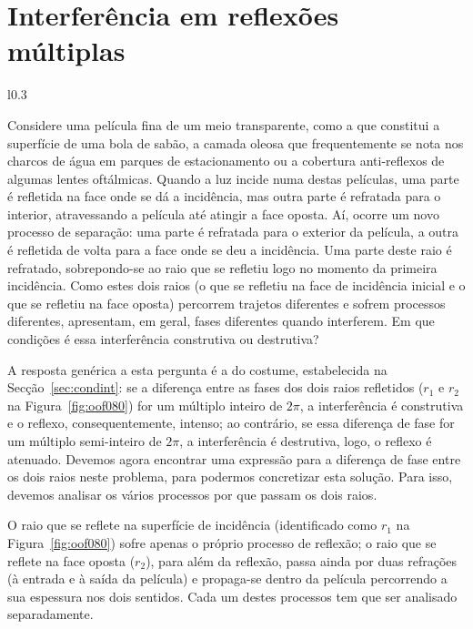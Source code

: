 \section{Interferência em reflexões múltiplas}
\begin{wrapfigure}[10]{l}{0.3\textwidth}
    {\centering
        \caption{Interferência em reflexões múltiplas\label{fig:oof080}}

    }
\end{wrapfigure}
Considere uma película fina de um meio transparente, como a que constitui a
superfície de uma bola de sabão, a camada oleosa que frequentemente se nota nos
charcos de água em parques de estacionamento ou a cobertura anti-reflexos de
algumas lentes oftálmicas. Quando a luz incide numa destas películas, uma parte
é refletida na face onde se dá a incidência, mas outra parte é refratada para o
interior, atravessando a película até atingir a face oposta. Aí, ocorre um novo
processo de separação: uma parte é refratada para o exterior da película, a
outra é refletida de volta para a face onde se deu a incidência. Uma parte deste
raio é refratado, sobrepondo-se ao raio que se refletiu logo no momento da
primeira incidência. Como estes dois raios (o que se refletiu na face de
incidência inicial e o que se refletiu na face oposta) percorrem trajetos
diferentes e sofrem processos diferentes, apresentam, em geral, fases diferentes
quando interferem. Em que condições é essa interferência construtiva ou
destrutiva?

A resposta genérica a esta pergunta é a do costume, estabelecida na
Secção~\ref{sec:condint}: se a diferença entre as fases dos dois raios
refletidos ($r_1$ e $r_2$ na Figura~\ref{fig:oof080}) for um múltiplo inteiro de
$2\pi$, a interferência é construtiva e o reflexo, consequentemente, intenso; ao
contrário, se essa diferença de fase for um múltiplo semi-inteiro de $2\pi$, a
interferência é destrutiva, logo, o reflexo é atenuado. Devemos agora encontrar
uma expressão para a diferença de fase entre os dois raios neste problema, para
podermos concretizar esta solução. Para isso, devemos analisar os vários
processos por que passam os dois raios.

O raio que se reflete na superfície de incidência (identificado como $r_1$ na
Figura~\ref{fig:oof080}) sofre apenas o próprio processo de reflexão; o raio que
se reflete na face oposta ($r_2$), para além da reflexão, passa ainda por duas
refrações (à entrada e à saída da película) e propaga-se dentro da película
percorrendo a sua espessura nos dois sentidos. Cada um destes processos tem que
ser analisado separadamente.

